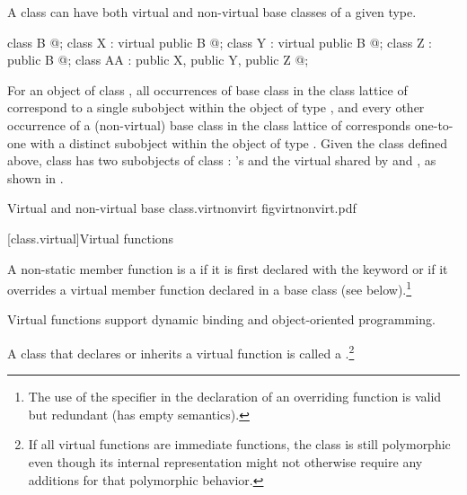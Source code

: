 \pnum
\begin{note}
A class can have both virtual and non-virtual base classes of a given
type.
\begin{codeblock}
class B { @\commentellip@ };
class X : virtual public B { @\commentellip@ };
class Y : virtual public B { @\commentellip@ };
class Z : public B { @\commentellip@ };
class AA : public X, public Y, public Z { @\commentellip@ };
\end{codeblock}
For an object of class , all  occurrences of
base class  in the class lattice of  correspond to a
single  subobject within the object of type , and
every other occurrence of a (non-virtual) base class  in the
class lattice of  corresponds one-to-one with a distinct
 subobject within the object of type . Given the
class  defined above, class  has two subobjects of
class : 's  and the virtual  shared
by  and , as shown in .

%
%
%
\begin{importgraphic}
{Virtual and non-virtual base}
{class.virtnonvirt}
{figvirtnonvirt.pdf}
\end{importgraphic}
\end{note}

[class.virtual]{Virtual functions}%
%
%

\pnum
A non-static member function is a 
if it is first declared with the keyword  or
if it overrides a virtual member function declared in a base class
(see below).\footnote{The use of the  specifier in the
declaration of an overriding function is valid but redundant (has empty
semantics).}
\begin{note}
Virtual functions support dynamic binding and object-oriented
programming.
\end{note}
A class that declares or inherits a virtual function is
called a .\footnote{If
all virtual functions are immediate functions,
the class is still polymorphic even though
its internal representation might not otherwise require
any additions for that polymorphic behavior.}

